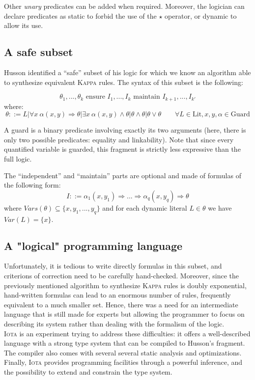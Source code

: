 \documentclass[10pt,a4paper]{article}
\newcommand\Iota{\textsc{Iota}}
\newcommand\Kappa{\textsc{Kappa}}
\begin{document}
Other \emph{unary} predicates can be added when required. Moreover, the logician can declare predicates as static to forbid the use of the $\star$ operator, or dynamic to allow its use.

\subsection{A safe subset}
Husson identified a ``safe'' subset of his logic for which we know an algorithm able to synthesize equivalent \Kappa{} rules. The syntax of this subset is the following\cite{husson}:
\label{hussonsyntax}

$$ \theta_1,... ,\theta_k \text{ ensure } I_1,...,I_k \text{ maintain } I_{k+1},...,I_{k'} $$
where:
$$ \theta ::= L | \forall x\ \alpha(x,y) \Rightarrow \theta | \exists x\ \alpha(x,y) \land \theta | \theta \land \theta | \theta \lor \theta \quad \quad \forall L \in \text{Lit},x,y,\alpha \in \text{Guard}$$

A guard is a binary predicate involving exactly its two arguments (here, there is only two possible predicates: equality and linkability). Note that since every quantified variable is guarded, this fragment is strictly less expressive than the full logic.

The ``independent'' and ``maintain'' parts are optional and made of formulas of the following form:
$$ I ::= \alpha_1(x,y_1) \Rightarrow ...\Rightarrow \alpha_q(x,y_q) \Rightarrow \theta $$
\label{criterion}
where $Vars(\theta) \subseteq \{x,y_1,...,y_q\}$ and for each dynamic literal $L \in \theta$ we have $Var(L) = \{x\}$.

\subsection{A "logical" programming language}
Unfortunately, it is tedious to write directly formulas in this subset, and criterions of correction need to be carefully hand-checked. Moreover, since the previously mentioned algorithm to synthesize \Kappa{} rules is doubly exponential, hand-written formulas can lead to an enormous number of rules, frequently equivalent to a much smaller set. Hence, there was a need for an intermediate language that is still made for experts but allowing the programmer to focus on describing its system rather than dealing with the formalism of the logic.\\

\Iota{} is an experiment trying to address these difficulties: it offers a well-described language with a strong type system that can be compiled to Husson's fragment. The compiler also comes with several several static analysis and optimizations. Finally, \Iota{} provides programming facilities through a powerful inference, and the possibility to extend and constrain the type system.
\end{document}
